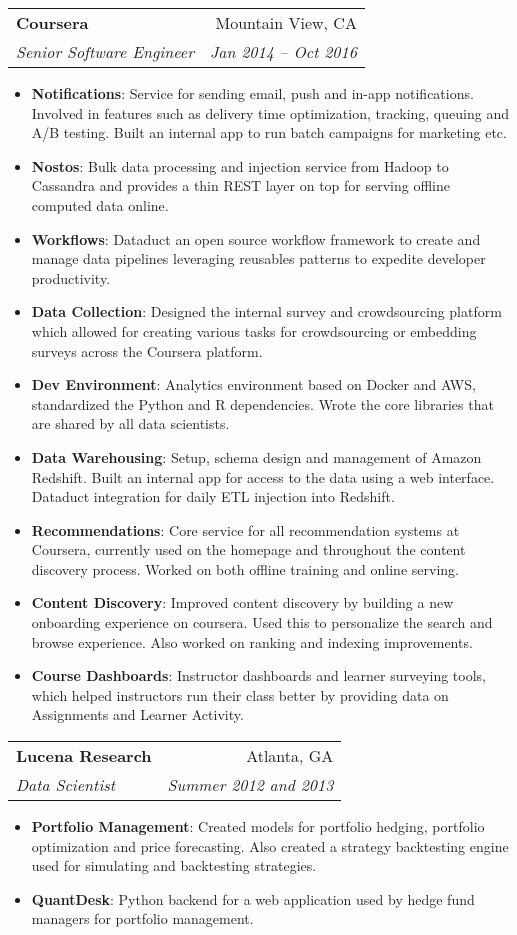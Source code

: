 \documentclass[letterpaper,11pt]{article}
\makeatletter
\newcommand{\resumeItem}[2]{
  \item\small{
    \textbf{#1}{: #2 \vspace{-2pt}}
  }
}
\newcommand{\resumeSubheading}[4]{
  \vspace{-1pt}\item
    \begin{tabular*}{0.97\textwidth}[t]{l@{\extracolsep{\fill}}r}
      \textbf{#1} & #2 \\
      \textit{\small#3} & \textit{\small #4} \\
    \end{tabular*}\vspace{-5pt}
}
\newcommand{\resumeItemListStart}{\begin{itemize}}
\newcommand{\resumeItemListEnd}{\end{itemize}\vspace{-5pt}}
\makeatother
\begin{document}
    \resumeSubheading
      {Coursera}{Mountain View, CA}
      {Senior Software Engineer}{Jan 2014 -- Oct 2016}
      \resumeItemListStart
        \resumeItem{Notifications}
          {Service for sending email, push and in-app notifications. Involved in features such as delivery time optimization, tracking, queuing and A/B testing. Built an internal app to run batch campaigns for marketing etc.}
        \resumeItem{Nostos}
          {Bulk data processing and injection service from Hadoop to Cassandra and provides a thin REST layer on top for serving offline computed data online.}
        \resumeItem{Workflows}
          {Dataduct an open source workflow framework to create and manage data pipelines leveraging reusables patterns to expedite developer productivity.}
        \resumeItem{Data Collection}
          {Designed the internal survey and crowdsourcing platform which allowed for creating various tasks for crowdsourcing or embedding surveys across the Coursera platform.}
        \resumeItem{Dev Environment}
          {Analytics environment based on Docker and AWS, standardized the Python and R dependencies. Wrote the core libraries that are shared by all data scientists.}
        \resumeItem{Data Warehousing}
          {Setup, schema design and management of Amazon Redshift. Built an internal app for access to the data using a web interface. Dataduct integration for daily ETL injection into Redshift.}
        \resumeItem{Recommendations}
          {Core service for all recommendation systems at Coursera, currently used on the homepage and throughout the content discovery process. Worked on both offline training and online serving.}
        \resumeItem{Content Discovery}
          {Improved content discovery by building a new onboarding experience on coursera. Used this to personalize the search and browse experience. Also worked on ranking and indexing improvements.}
        \resumeItem{Course Dashboards}
          {Instructor dashboards and learner surveying tools, which helped instructors run their class better by providing data on Assignments and Learner Activity.}
      \resumeItemListEnd

    \resumeSubheading
      {Lucena Research}{Atlanta, GA}
      {Data Scientist}{Summer 2012 and 2013}
      \resumeItemListStart
        \resumeItem{Portfolio Management}
          {Created models for portfolio hedging, portfolio optimization and price forecasting. Also created a strategy backtesting engine used for simulating and backtesting strategies.}
        \resumeItem{QuantDesk}
          {Python backend for a web application used by hedge fund managers for portfolio management.}
      \resumeItemListEnd
\end{document}
